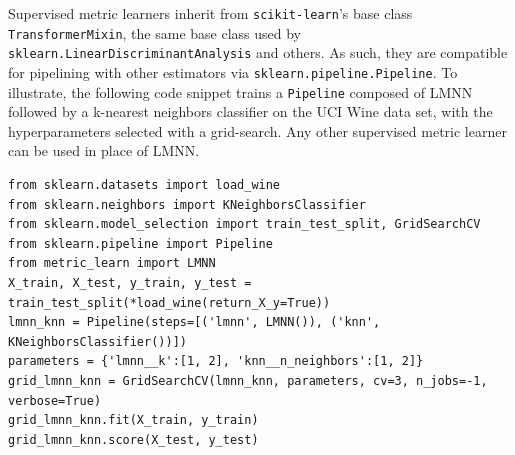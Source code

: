 \documentclass[twoside,11pt]{article}
\newcommand{\aurelien}[1]{\todo[inline,caption={},color=orange!40]{{\it Aurelien:~}#1}}
\begin{document}
Supervised metric learners inherit from \texttt{scikit-learn}'s base class \texttt{TransformerMixin}, the same base class used by \texttt{sklearn.LinearDiscriminantAnalysis} and others.
As such, they are compatible for pipelining with other estimators via \texttt{sklearn.pipeline.Pipeline}.
To illustrate, the following code snippet trains a \texttt{Pipeline} composed of LMNN followed by a k-nearest neighbors classifier on the UCI Wine data set, with the hyperparameters selected with a grid-search. Any other supervised metric learner can be used in place of LMNN.
\begin{verbatim}
from sklearn.datasets import load_wine
from sklearn.neighbors import KNeighborsClassifier
from sklearn.model_selection import train_test_split, GridSearchCV
from sklearn.pipeline import Pipeline
from metric_learn import LMNN
X_train, X_test, y_train, y_test = train_test_split(*load_wine(return_X_y=True))
lmnn_knn = Pipeline(steps=[('lmnn', LMNN()), ('knn', KNeighborsClassifier())])
parameters = {'lmnn__k':[1, 2], 'knn__n_neighbors':[1, 2]}
grid_lmnn_knn = GridSearchCV(lmnn_knn, parameters, cv=3, n_jobs=-1, verbose=True)
grid_lmnn_knn.fit(X_train, y_train)
grid_lmnn_knn.score(X_test, y_test)
\end{verbatim}

\end{document}
